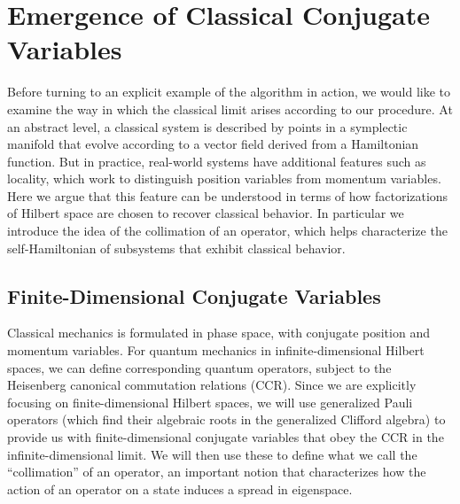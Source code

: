 \documentclass[aps,pra,onecolumn,nofootinbib,12pt,tightenlines]{revtex4-1}
\begin{document}
\section{Emergence of Classical Conjugate Variables} 
\label{sec:conjugate}

{Before turning to an explicit example of the algorithm in action, we would like to examine the way in which the classical limit arises according to our procedure.
At an abstract level, a classical system is described by points in a symplectic manifold that evolve according to a vector field derived from a Hamiltonian function.
But in practice, real-world systems have additional features such as locality, which work to distinguish position variables from momentum variables.
Here we argue that this feature can be understood in terms of how factorizations of Hilbert space are chosen to recover classical behavior.
In particular we introduce the idea of the collimation of an operator, which helps characterize the self-Hamiltonian of subsystems that exhibit classical behavior.}

\subsection{Finite-Dimensional Conjugate Variables}

Classical mechanics is formulated in phase space, with conjugate position and momentum variables.
For quantum mechanics in infinite-dimensional Hilbert spaces, we can define corresponding quantum operators, subject to the Heisenberg canonical commutation relations (CCR). 
Since we are explicitly focusing on finite-dimensional Hilbert spaces, we will use generalized Pauli operators (which find their algebraic roots in the generalized Clifford algebra) to provide us with finite-dimensional conjugate variables that obey the CCR in the infinite-dimensional limit. 
We will then use these to define what we call the ``collimation'' of an operator, an important notion that characterizes how the action of an operator on a state induces a spread in eigenspace.
\end{document}
